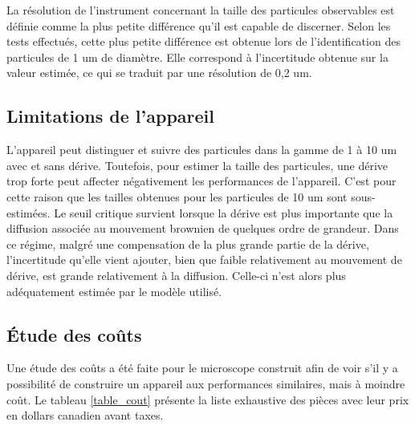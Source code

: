 \documentclass[11pt,letterpaper]{article}
\begin{document}
La résolution de l'instrument concernant la taille des particules observables est définie
comme la plus petite différence qu'il est capable de discerner. Selon les tests effectués, 
cette plus petite différence est obtenue lors de l'identification des particules de 1 um 
de diamètre. Elle correspond à l'incertitude obtenue sur la valeur estimée, ce qui se traduit
par une résolution de 0,2 um. 

\subsection{Limitations de l'appareil}

L'appareil peut distinguer et suivre des particules dans la gamme de 1 à 10 um avec et sans dérive.
Toutefois, pour estimer la taille des particules, une dérive trop forte peut affecter négativement 
les performances de l'appareil. C'est pour cette raison que les tailles obtenues pour les particules
de 10 um sont sous-estimées. Le seuil critique survient lorsque la dérive est plus importante que la 
diffusion associée au mouvement brownien de quelques ordre de grandeur. Dans ce régime, malgré une 
compensation de la plus grande partie de la dérive, l'incertitude qu'elle vient ajouter, bien que faible
relativement au mouvement de dérive, est grande relativement à la diffusion. Celle-ci n'est alors plus 
adéquatement estimée par le modèle utilisé. 


\subsection{Étude des coûts}

Une étude des coûts a été faite pour le microscope construit afin de voir s'il y a possibilité
de construire un appareil aux performances similaires, mais à moindre coût. Le tableau \ref{table_cout}
présente la liste exhaustive des pièces avec leur prix en dollars canadien avant taxes.
\end{document}
